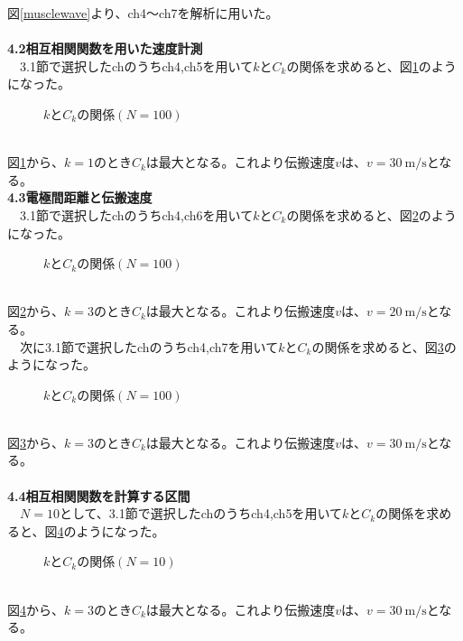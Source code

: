 \documentclass[a4paper,10.5pt]{ltjsarticle}
\begin{document}
図\ref{musclewave}より、ch4〜ch7を解析に用いた。\\
\\
{\large \bfseries 4.2相互相関関数を用いた速度計測}\\
　3.1節で選択したchのうちch4,ch5を用いて$k$と$C_k$の関係を求めると、図\ref{4-5N=100}のようになった。
\begin{figure}[h]
  \centering
  
  \vspace{-35pt}\caption{$k$と$C_k$の関係$(N=100)$}
  \label{4-5N=100}
\end{figure}\\
図\ref{4-5N=100}から、$k=1$のとき$C_k$は最大となる。これより伝搬速度$v$は、$v=30\ \mathrm{m/s}$となる。\\
\clearpage
{\large \bfseries 4.3電極間距離と伝搬速度}\\
　3.1節で選択したchのうちch4,ch6を用いて$k$と$C_k$の関係を求めると、図\ref{4-6N=100}のようになった。
\begin{figure}[h]
  \centering
  
  \vspace{-35pt}\caption{$k$と$C_k$の関係$(N=100)$}
  \label{4-6N=100}
\end{figure}\\
図\ref{4-6N=100}から、$k=3$のとき$C_k$は最大となる。これより伝搬速度$v$は、$v=20\ \mathrm{m/s}$となる。\\
　次に3.1節で選択したchのうちch4,ch7を用いて$k$と$C_k$の関係を求めると、図\ref{4-7N=100}のようになった。
\begin{figure}[h]
  \centering
  
  \vspace{-35pt}\caption{$k$と$C_k$の関係$(N=100)$}
  \label{4-7N=100}
\end{figure}\\
図\ref{4-7N=100}から、$k=3$のとき$C_k$は最大となる。これより伝搬速度$v$は、$v=30\ \mathrm{m/s}$となる。\\
\\
{\large \bfseries 4.4相互相関関数を計算する区間}\\
　$N=10$として、3.1節で選択したchのうちch4,ch5を用いて$k$と$C_k$の関係を求めると、図\ref{4-5N=10}のようになった。
\begin{figure}[h]
  \centering
  
  \vspace{-35pt}\caption{$k$と$C_k$の関係$(N=10)$}
  \label{4-5N=10}
\end{figure}\\
図\ref{4-5N=10}から、$k=3$のとき$C_k$は最大となる。これより伝搬速度$v$は、$v=30\ \mathrm{m/s}$となる。\\
\end{document}

